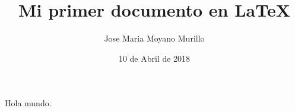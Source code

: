 \documentclass{article}
\title{Mi primer documento en LaTeX}
\author{Jose Maria Moyano Murillo}
\date{10 de Abril de 2018}
\begin{document}
\maketitle
\clearpage
Hola mundo.
\end{document}
